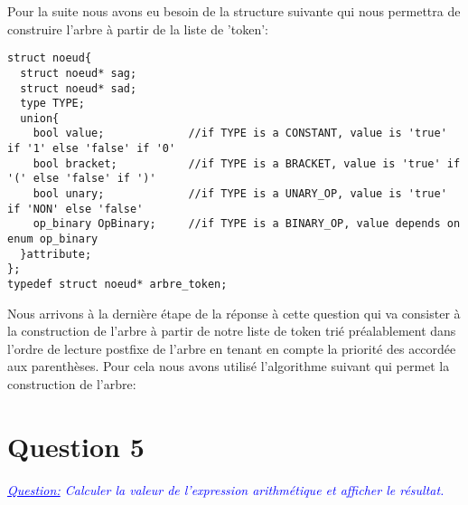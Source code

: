 \documentclass{article}
\begin{document}
\newline
\newline
Pour la suite nous avons eu besoin de la structure suivante qui nous permettra de construire l'arbre à partir de la liste de 'token':
\begin{verbatim}
struct noeud{
  struct noeud* sag;
  struct noeud* sad;
  type TYPE;
  union{
    bool value;             //if TYPE is a CONSTANT, value is 'true' if '1' else 'false' if '0'
    bool bracket;           //if TYPE is a BRACKET, value is 'true' if '(' else 'false' if ')'
    bool unary;             //if TYPE is a UNARY_OP, value is 'true' if 'NON' else 'false'
    op_binary OpBinary;     //if TYPE is a BINARY_OP, value depends on enum op_binary
  }attribute;
};
typedef struct noeud* arbre_token;
\end{verbatim}

Nous arrivons à la dernière étape de la réponse à cette question qui va consister à la construction de l'arbre à partir de notre liste de token trié préalablement dans l'ordre de lecture postfixe de l'arbre en tenant en compte la priorité des accordée aux parenthèses. 
\newline\newline
Pour cela nous avons utilisé l'algorithme suivant qui permet la construction de l'arbre:
\newline\newline
{}
\section*{Question 5}
\textit{
\textcolor{blue}{
\underline{Question:}
Calculer la valeur de l’expression arithmétique et afficher le résultat.
}
}
\end{document}
